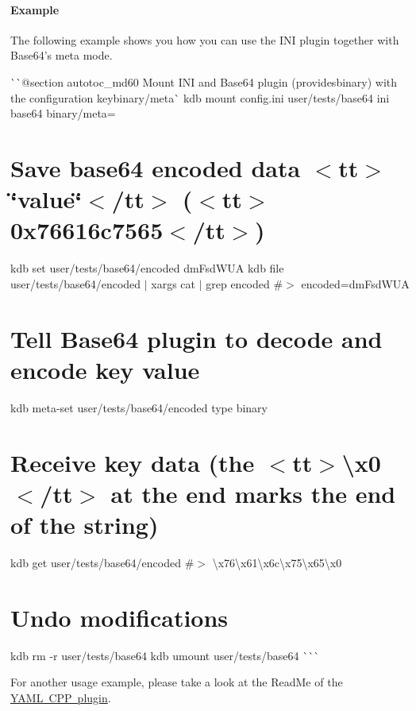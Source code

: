 \hypertarget{autotoc_md52_autotoc_md59}{}\paragraph{Example}\label{autotoc_md52_autotoc_md59}
The following example shows you how you can use the I\+NI plugin together with Base64’s meta mode.

\`{}\`{}{\ttfamily  @section autotoc\+\_\+md60 Mount I\+NI and Base64 plugin (provides}binary{\ttfamily ) with the configuration key}binary/meta\`{} kdb mount config.\+ini user/tests/base64 ini base64 binary/meta=\hypertarget{autotoc_md52_autotoc_md61}{}\section{Save base64 encoded data $<$tt$>$\char`\"{}value\char`\"{}$<$/tt$>$ ($<$tt$>$0x76616c7565$<$/tt$>$)}\label{autotoc_md52_autotoc_md61}
kdb set user/tests/base64/encoded dm\+Fsd\+W\+UA kdb file user/tests/base64/encoded $\vert$ xargs cat $\vert$ grep encoded \#$>$ encoded=dm\+Fsd\+W\+UA\hypertarget{autotoc_md52_autotoc_md62}{}\section{Tell Base64 plugin to decode and encode key value}\label{autotoc_md52_autotoc_md62}
kdb meta-\/set user/tests/base64/encoded type binary\hypertarget{autotoc_md52_autotoc_md63}{}\section{Receive key data (the $<$tt$>$\textbackslash{}x0$<$/tt$>$ at the end marks the end of the string)}\label{autotoc_md52_autotoc_md63}
kdb get user/tests/base64/encoded \#$>$ \textbackslash{}x76\textbackslash{}x61\textbackslash{}x6c\textbackslash{}x75\textbackslash{}x65\textbackslash{}x0\hypertarget{autotoc_md52_autotoc_md64}{}\section{Undo modifications}\label{autotoc_md52_autotoc_md64}
kdb rm -\/r user/tests/base64 kdb umount user/tests/base64 \`{}\`{}\`{}

For another usage example, please take a look at the Read\+Me of the \mbox{\hyperlink{autotoc_md780_src_plugins_yamlcpp_README_md}{Y\+A\+ML C\+PP plugin}}. 